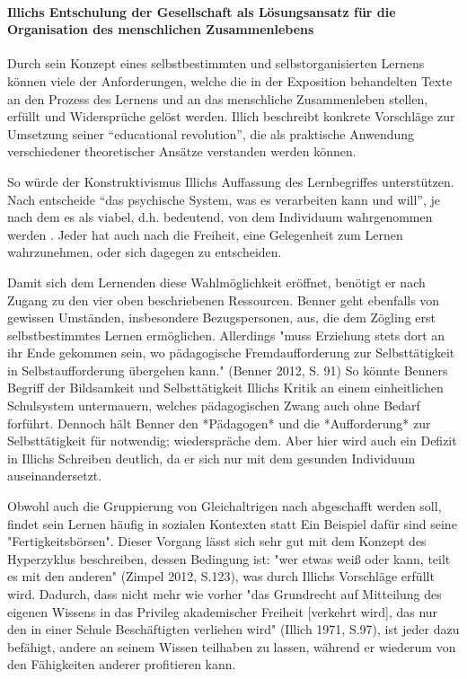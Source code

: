 {\paragraph*{Illichs Entschulung der Gesellschaft als Lösungsansatz für die Organisation des menschlichen Zusammenlebens}

Durch sein Konzept eines selbstbestimmten und selbstorganisierten Lernens können viele der Anforderungen, welche die in der Exposition behandelten Texte an den Prozess des Lernens und an das menschliche Zusammenleben stellen, erfüllt und Widersprüche gelöst werden.
Illich beschreibt konkrete Vorschläge zur Umsetzung seiner ``educational revolution'', die als praktische Anwendung verschiedener theoretischer Ansätze verstanden werden können.

So würde der Konstruktivismus Illichs Auffassung des Lernbegriffes unterstützen.
Nach \citeauthor{siebert-2003} entscheide ``das psychische System, was es verarbeiten kann und will'', je nach dem es als viabel, d.h. bedeutend, von dem Individuum wahrgenommen werden \citep[13]{siebert-2003}.
Jeder hat auch nach \citeauthor{Illich-1971} die Freiheit, eine Gelegenheit zum Lernen wahrzunehmen, oder sich dagegen zu entscheiden.

Damit sich dem Lernenden diese Wahlmöglichkeit eröffnet, benötigt er nach \citeauthor{Illich-1971} Zugang zu den vier oben beschriebenen Ressourcen.
Benner geht ebenfalls von gewissen Umständen, insbesondere Bezugspersonen, aus, die dem Zögling erst selbstbestimmtes Lernen ermöglichen.
Allerdings "muss Erziehung stets dort an ihr Ende gekommen sein, wo pädagogische Fremdaufforderung zur Selbsttätigkeit in Selbstaufforderung übergehen kann." (Benner 2012, S. 91)
So könnte Benners Begriff der Bildsamkeit und Selbsttätigkeit Illichs Kritik an einem einheitlichen Schulsystem untermauern, welches pädagogischen Zwang auch ohne Bedarf forführt.
Dennoch hält Benner den *Pädagogen* und die *Aufforderung* zur Selbsttätigkeit für notwendig; \citeauthor{Illich-1971} wiederspräche dem.
Aber hier wird auch ein Defizit in Illichs Schreiben deutlich, da er sich nur mit dem gesunden Individuum auseinandersetzt.

Obwohl auch die Gruppierung von Gleichaltrigen nach \citeauthor{Illich-1971} abgeschafft werden soll, findet sein Lernen häufig in sozialen Kontexten statt
Ein Beispiel dafür sind seine "Fertigkeitsbörsen".
Dieser Vorgang lässt sich sehr gut mit dem Konzept des Hyperzyklus beschreiben, dessen Bedingung ist: "wer etwas weiß oder kann, teilt es mit den anderen" (Zimpel 2012, S.123), was durch Illichs Vorschläge erfüllt wird.
Dadurch, dass nicht mehr wie vorher "das Grundrecht auf Mitteilung des eigenen Wissens in das Privileg akademischer Freiheit [verkehrt wird], das nur den in einer Schule Beschäftigten verliehen wird" (Illich 1971, S.97), ist jeder dazu befähigt, andere an seinem Wissen teilhaben zu lassen, während er wiederum von den Fähigkeiten anderer profitieren kann.

}
